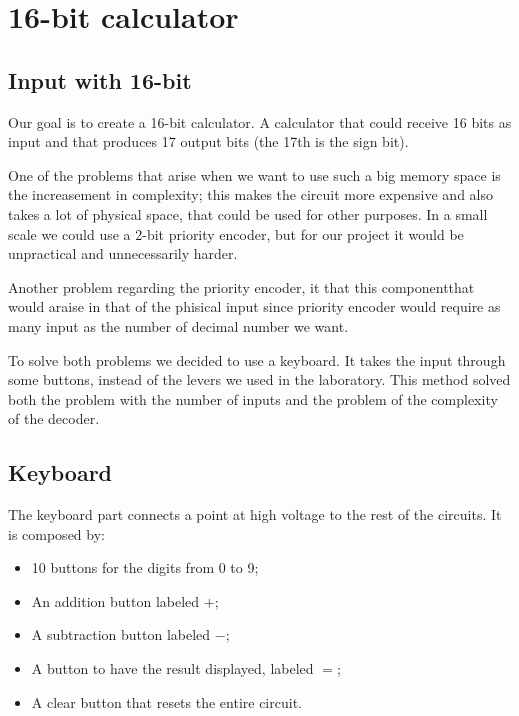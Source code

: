 \documentclass{article}
\begin{document}
\clearpage

\section{16-bit calculator} \label{SimulatedCalculator}



\subsection{Input with 16-bit}

Our goal is to create a 16-bit calculator. A calculator that could receive 16 bits as input and that produces 17 output bits (the 17th is the sign bit).

One of the problems that arise when we want to use such a big memory space is the increasement in complexity; this makes the circuit more expensive and also takes a lot of physical space, that could be used for other purposes. In a small scale we could use a 2-bit priority encoder, but for our project it would be unpractical and unnecessarily harder.

\vspace{3mm}

Another problem regarding the priority encoder, it that this componentthat would araise in that of the phisical input since  priority encoder would require as many input as the number of decimal number we want. %

\vspace{3mm}

To solve both problems we decided to use a keyboard. It takes the input through some buttons, instead of the levers we used in the laboratory. This method solved both the problem with the number of inputs and the problem of the complexity of the decoder.



\subsection{Keyboard}

The keyboard part connects a point at high voltage to the rest of the circuits. It is composed by: 

\begin{itemize}
    \item 10 buttons for the digits from 0 to 9;
    \item An addition button labeled $+$;
    \item A subtraction button labeled $-$;
    \item A button to have the result displayed, labeled $=$;
    \item A clear button that resets the entire circuit.
\end{itemize}
\end{document}
